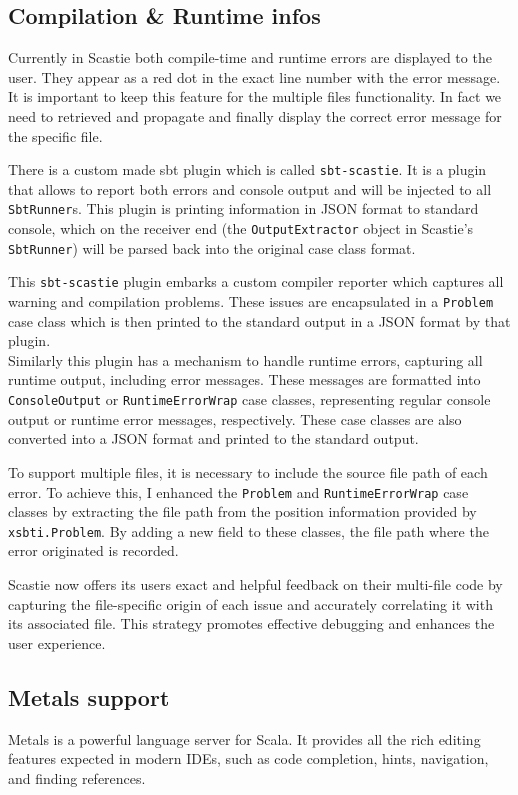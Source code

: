 \documentclass[a4paper,11pt,oneside]{report}
\begin{document}
\subsection{Compilation \& Runtime infos}
Currently in Scastie both compile-time and runtime errors are displayed to the user. They appear as a red dot in the exact line number with the error message. It is important to keep this feature for the multiple files functionality. In fact we need to retrieved and propagate and finally display the correct error message for the specific file.

There is a custom made sbt plugin which is called \lstinline{sbt-scastie}. It is a plugin that allows to report both errors and console output and will be injected to all \lstinline{SbtRunner}s.
This plugin is printing information in JSON format to standard console, which on the receiver end (the \lstinline{OutputExtractor} object in Scastie's \lstinline{SbtRunner}) will be parsed back into the original case class format.

This \lstinline{sbt-scastie} plugin embarks a custom compiler reporter which captures all warning and compilation problems. These issues are encapsulated in a \lstinline{Problem} case class which is then printed to the standard output in a JSON format by that plugin.\\
Similarly this plugin has a mechanism to handle runtime errors, capturing all runtime output, including error messages. These messages are formatted into \lstinline{ConsoleOutput} or \lstinline{RuntimeErrorWrap} case classes, representing regular console output or runtime error messages, respectively. These case classes are also converted into a JSON format and printed to the standard output.

To support multiple files, it is necessary to include the source file path of each error. To achieve this, I enhanced the \lstinline{Problem} and \lstinline{RuntimeErrorWrap} case classes by extracting the file path from the position information provided by \lstinline{xsbti.Problem}. By adding a new field to these classes, the file path where the error originated is recorded. 

Scastie now offers its users exact and helpful feedback on their multi-file code by capturing the file-specific origin of each issue and accurately correlating it with its associated file. This strategy promotes effective debugging and enhances the user experience.

\subsection{Metals support}
Metals is a powerful language server for Scala. It provides all the rich editing features expected in modern IDEs, such as code completion, hints, navigation, and finding references.
\end{document}
